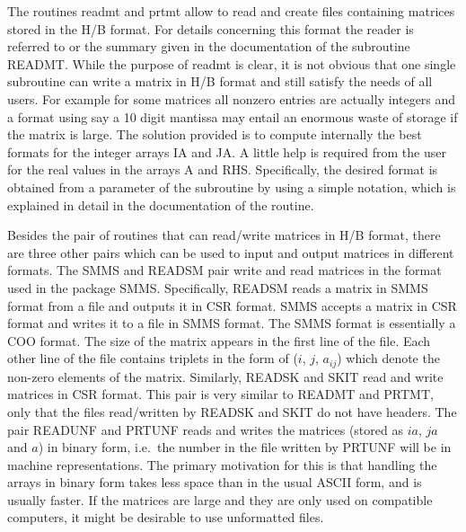 The routines readmt and prtmt allow to read and create files
containing matrices stored in the H/B format. 
For details concerning this format the reader is referred to
\cite{Duff-HB} or the summary given in the documentation  of
the subroutine READMT. While the purpose of
readmt is clear, it is not obvious that one single 
subroutine can write a matrix in H/B format and still satisfy
the needs of all users. For example for some matrices all nonzero
entries are actually integers and a format using say a 10 digit
mantissa may entail an enormous waste of storage if the matrix
is large. The solution provided is to compute internally the best
formats for the integer arrays IA and JA. A little help is 
required from the user for the real values in the arrays A and
RHS. Specifically, the desired format is obtained from
a parameter of the subroutine by using a simple notation, 
which is explained in detail in the documentation of the routine. 

Besides the pair of routines that can read/write matrices in H/B
format, there are three other pairs which can be used to input and
output matrices in different formats. The SMMS and READSM pair write
and read matrices in the format used in the package SMMS.
Specifically, READSM reads a matrix in SMMS format from a file and outputs
it in CSR format. SMMS accepts a matrix in CSR format and
writes it to a file in SMMS format. The SMMS format is
essentially a COO format. 
The size of the matrix appears in the first line of the file. Each other
line of the file
contains triplets in the form of ($i$, $j$, $a_{ij}$) which
denote the non-zero elements of the matrix.
Similarly, READSK and SKIT read and write matrices in CSR format. 
This pair is very similar to READMT and PRTMT, only that the
files read/written by READSK and SKIT do not have headers. The pair 
READUNF and PRTUNF reads and writes the matrices (stored as $ia$, $ja$
and $a$) in binary form,
i.e.~the number in the file written by PRTUNF will be in machine
representations. The primary motivation for this is that
handling the arrays in binary form takes less space than in the
usual ASCII form, and is usually  faster.
If the matrices are large and they are only used on compatible computers,
it might be desirable to use unformatted files.

